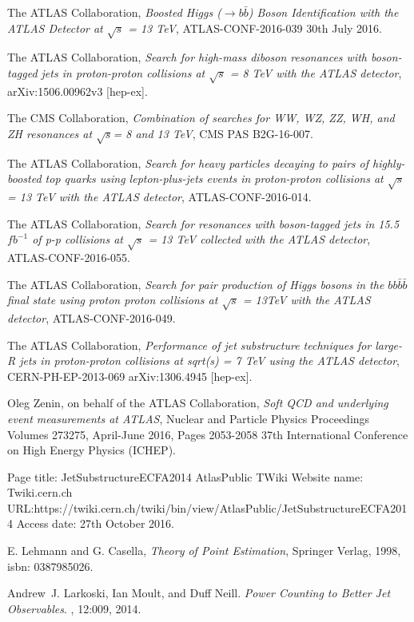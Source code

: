 \documentclass[UKenglish,texlive=2013]{\ATLASLATEXPATH atlasdoc}
\newcommand{\cme}{\sqrt{s}}
\begin{document}
\begin{thebibliography}{9}
The ATLAS Collaboration,
\emph{Boosted Higgs ($\to b\bar{b}$) Boson Identification with the ATLAS
Detector at $\cme$ = 13 TeV},
ATLAS-CONF-2016-039
30th July 2016.

The ATLAS Collaboration,
\emph{Search for high-mass diboson resonances with boson-tagged jets in proton-proton collisions at $\cme$ = 8 TeV with the ATLAS detector},
arXiv:1506.00962v3 [hep-ex].

The CMS Collaboration,
\emph{Combination of searches for WW, WZ, ZZ, WH, and ZH
resonances at $\cme$= 8 and 13 TeV},
CMS PAS B2G-16-007.

The ATLAS Collaboration,
\emph{Search for heavy particles decaying to pairs of highly-boosted top
quarks using lepton-plus-jets events in proton-proton collisions at
$\cme$ = 13 TeV with the ATLAS detector},
ATLAS-CONF-2016-014.

The ATLAS Collaboration,
\emph{Search for resonances with boson-tagged jets in 15.5 $fb^{-1}$ of p-p
collisions at $\cme$ = 13 TeV collected with the ATLAS detector},
ATLAS-CONF-2016-055.

The ATLAS Collaboration,
\emph{Search for pair production of Higgs bosons in the $bb\bar{b}\bar{b}$ final state
using proton proton collisions at $\cme$ = 13TeV with the ATLAS detector},
ATLAS-CONF-2016-049.

The ATLAS Collaboration,
\emph{Performance of jet substructure techniques for large-R jets in proton-proton collisions at sqrt(s) = 7 TeV using the ATLAS detector},
CERN-PH-EP-2013-069
arXiv:1306.4945 [hep-ex].

Oleg Zenin, on behalf of the ATLAS Collaboration,
\emph{Soft QCD and underlying event measurements at ATLAS},
Nuclear and Particle Physics Proceedings
Volumes 273275, April-June 2016, Pages 2053-2058
37th International Conference on High Energy Physics (ICHEP).

Page title: JetSubstructureECFA2014 AtlasPublic TWiki
Website name: Twiki.cern.ch
URL:https://twiki.cern.ch/twiki/bin/view/AtlasPublic/JetSubstructureECFA2014
Access date: 27th October 2016.

E. Lehmann and G. Casella,
\emph{Theory of Point Estimation},
Springer Verlag, 1998,
isbn: 0387985026.


Andrew~J. Larkoski, Ian Moult, and Duff Neill.
\emph {Power Counting to Better Jet Observables}.
, 12:009, 2014.


\end{thebibliography}
\end{document}
